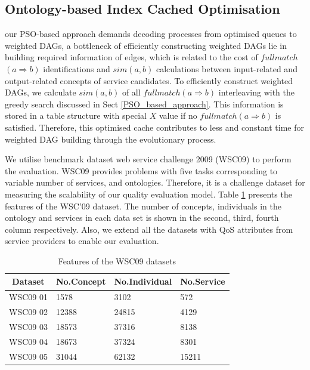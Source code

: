 \subsection{Ontology-based Index Cached Optimisation}\label{indexCache}
our PSO-based approach demands decoding processes from optimised queues to weighted DAGs, a bottleneck of efficiently constructing weighted DAGs lie in building required information of edges, which is related to the cost of $fullmatch$
$(a \Rightarrow b)$ identifications and $sim(a, b)$ calculations between input-related and output-related concepts of service candidates. To efficiently construct weighted DAGs, we calculate $sim(a, b)$ of all $fullmatch(a \Rightarrow b)$ interleaving with the greedy search discussed in Sect \ref{PSO_based_approach}. This information is stored in a table structure with special $X$ value if no $fullmatch(a \Rightarrow b)$ is satisfied. Therefore, this optimised cache contributes to less and constant time for weighted DAG building through the evolutionary process.


We utilise benchmark dataset web service challenge 2009 (WSC09) \cite{kona2009wsc} to perform the evaluation. WSC09 provides problems with five tasks corresponding to variable number of services, and ontologies. Therefore, it is a challenge dataset for measuring the scalability of our quality evaluation model. Table \ref{wsc09datasetTable} presents the features of the WSC’09 dataset. The number of concepts, individuals in the ontology and services in each data set is shown in the second, third, fourth column respectively. Also, we extend all the datasets with QoS attributes from service providers to enable our evaluation. 

\begin{table}[]
\centering
\caption{Features of the WSC09 datasets}
\label{wsc09datasetTable}
\begin{tabular}{l|l|l|l}
\hline
\multicolumn{1}{c|}{Dataset} & No.Concept & No.Individual & No.Service \\ \hline
WSC09 01                     & 1578       &3102           &572      \\ \hline
WSC09 02                     & 12388      &24815          &4129      \\ \hline
WSC09 03                     & 18573      &37316          &8138      \\ \hline
WSC09 04                     & 18673      &37324          &8301      \\ \hline
WSC09 05                     & 31044      &62132          &15211    \\ \hline
\end{tabular}
\end{table}

